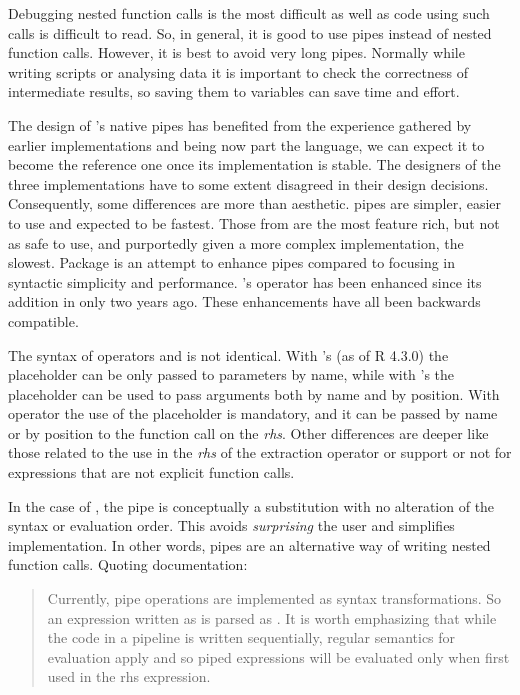 \documentclass[krantz2]{krantz}\usepackage{knitr}
\begin{document}
Debugging nested function calls is the most difficult as well as code using such calls is difficult to read. So, in general, it is good to use pipes instead of nested function calls. However, it is best to avoid very long pipes. Normally while writing scripts or analysing data it is important to check the correctness of intermediate results, so saving them to variables can save time and effort.

The design of \Rlang's native pipes has benefited from the experience gathered by earlier implementations and being now part the language, we can expect it to become the reference one once its implementation is stable. The designers of the three implementations have to some extent disagreed in their design decisions. Consequently, some differences are more than aesthetic. \Rlang pipes are simpler, easier to use and expected to be fastest. Those from  are the most feature rich, but not as safe to use, and purportedly given a more complex implementation, the slowest. Package  is an attempt to enhance pipes compared to  focusing in syntactic simplicity and performance. \Rlang's \Roperator{\textbar >} operator has been enhanced since its addition in \Rlang only two years ago. These enhancements have all been backwards compatible.

The syntax of operators \Roperator{\textbar >} and \Roperator{\%>\%} is not identical. With \Rlang's \Roperator{\textbar >} (as of R 4.3.0) the placeholder \code{\_} can be only passed to parameters by name, while with 's \Roperator{\%>\%} the placeholder  can be used to pass arguments both by name and by position. With operator  the use of the placeholder  is mandatory, and it can be passed by name or by position to the function call on the \textit{rhs}. Other differences are deeper like those related to the use in the \emph{rhs} of the extraction operator or support or not for expressions that are not explicit function calls.

In the case of \Rlang, the pipe is conceptually a substitution with no alteration of the syntax or evaluation order. This avoids \emph{surprising} the user and simplifies implementation. In other words, \Rlang pipes are an alternative way of writing nested function calls. Quoting \Rlang documentation:

\begin{quotation}
  Currently, pipe operations are implemented as syntax transformations. So an expression written as  is parsed as . It is worth emphasizing that while the code in a pipeline is written sequentially, regular \Rlang semantics for evaluation apply and so piped expressions will be evaluated only when first used in the rhs expression.
\end{quotation}
\end{document}
